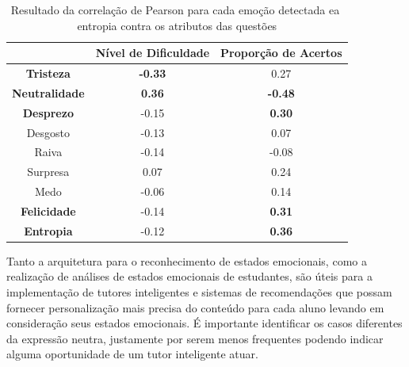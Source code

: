 \begin{table}[]\footnotesize
\centering
\caption{Resultado​ ​da​ ​correla\c{c}\~ao​ ​de​ ​Pearson​ ​para​ ​cada​ ​emo\c{c}\~ao​ ​detectada
e​ ​a​ ​entropia​ ​contra​ ​os​ ​atributos​ ​das​ ​quest\~oes}
\label{tabelaArti}
\begin{tabular}{|c|c|c|}
\hline
                      & \textbf{Nível de Dificuldade} & \textbf{Proporção de Acertos} \\ \hline
\textbf{Tristeza}     & \textbf{-0.33}                & 0.27                          \\ \hline
\textbf{Neutralidade} & \textbf{0.36}                 & \textbf{-0.48}                \\ \hline
\textbf{Desprezo}     & -0.15                         & \textbf{0.30}                 \\ \hline
Desgosto              & -0.13                         & 0.07                          \\ \hline
Raiva                 & -0.14                         & -0.08                         \\ \hline
Surpresa              & 0.07                          & 0.24                          \\ \hline
Medo                  & -0.06                         & 0.14                          \\ \hline
\textbf{Felicidade}   & -0.14                         & \textbf{0.31}                 \\ \hline
\textbf{Entropia}     & -0.12                         & \textbf{0.36}                 \\ \hline
\end{tabular}
\end{table}


Tanto a arquitetura para o reconhecimento de estados emocionais, como a
realização de análises de estados emocionais de estudantes, são úteis para a implementação de tutores inteligentes e sistemas de recomendações que possam fornecer personalização mais precisa do conteúdo para cada aluno levando em consideração seus estados emocionais. É importante identificar os casos diferentes da expressão neutra, justamente por serem menos frequentes podendo indicar alguma oportunidade de um tutor inteligente atuar.


